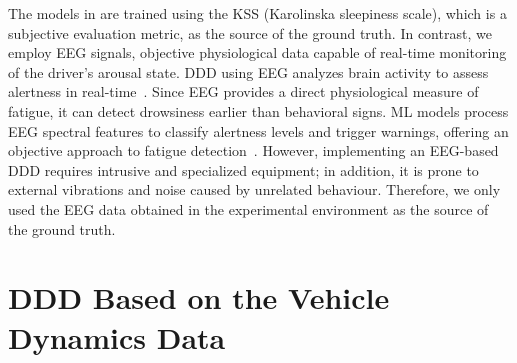 \documentclass[letterpaper, 10 pt, conference]{ieeeconf}  %
\begin{document}
{The models in \cite{Arefnezhad2019,Krajewski2009,Sandberg2008,Chai2019}} are trained using the KSS (Karolinska sleepiness scale), which is a subjective evaluation metric, as the source of the ground truth. 
In contrast, we employ EEG signals, objective physiological data capable of real-time monitoring of the driver's arousal state. 
%
DDD using EEG analyzes brain activity to assess alertness in real-time~\cite{Jung1997}. 
Since EEG provides a direct physiological measure of fatigue, it can detect drowsiness earlier than behavioral signs. 
ML models process EEG spectral features to classify alertness levels and trigger warnings, offering an objective approach to fatigue detection~\cite{Jap2009}.
%
However, implementing an EEG-based DDD 
requires intrusive and specialized equipment; 
in addition, it is prone to external vibrations and noise caused by unrelated behaviour.
Therefore, we only used the EEG data obtained in the experimental environment as the source of the ground truth.

%

%

\section{DDD Based on the Vehicle Dynamics Data}
\label{sec:method}

\end{document}
